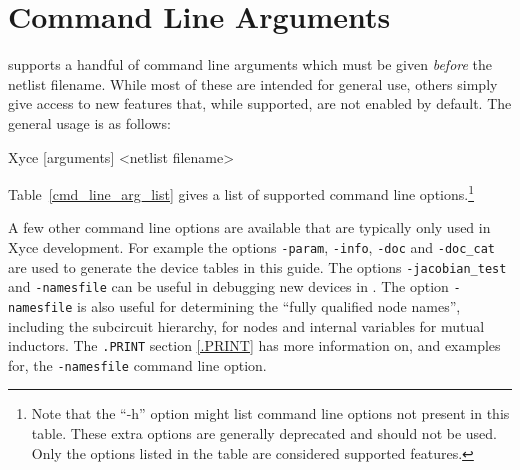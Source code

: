 



\chapter{Command Line Arguments}
\label{cmd_line_args}

\Xyce{} supports a handful of command line arguments which must be given {\em
  before} the netlist filename.  While most of these are intended for general
use, others simply give access to new features that, while supported, are not 
enabled by default.  The general usage is as follows:
\begin{vquote}
  Xyce [arguments] <netlist filename>
\end{vquote}

Table~\ref{cmd_line_arg_list} gives a list of supported command line
options.\footnote{Note that the ``-h'' option might list command line options not present 
in this table.  These extra options are generally deprecated and should not be used.  Only 
the options listed in the table are considered supported features.}



A few other command line options are available that are typically only used in Xyce development.  
For example the options {\tt -param}, {\tt -info}, {\tt -doc} and {\tt -doc\_cat} are 
used to generate the device tables in this guide.  The options {\tt -jacobian\_test} 
and {\tt -namesfile} can be useful in debugging new devices in \Xyce{}.  The option
 {\tt -namesfile} is also useful for determining the ``fully qualified node
names'', including the subcircuit hierarchy, for nodes and internal variables for mutual
inductors.  The {\tt .PRINT} section \ref{.PRINT} has more information on, and examples for,
the {\tt -namesfile} command line option.

